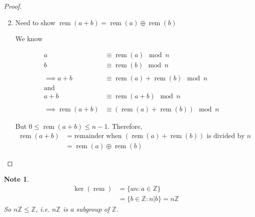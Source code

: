 \documentclass[11pt, oneside]{book}
\theoremstyle{break}
\newtheorem*{proof}{Proof}
\newtheorem*{note}{Note}
\newcommand{\bb}[1]{\mathbb{#1}}			%
\DeclareMathOperator{\rem}{rem}
\begin{document}
\begin{proof}
    \begin{enumerate}
        \setcounter{enumi}{1}
        \item Need to show $\rem(a + b) = \rem(a) \oplus \rem(b)$

            We know

            \begin{align*}
                a &\equiv \rem(a) \mod n \\
                b &\equiv \rem(b) \mod n \\
                    \\
                \implies a + b &\equiv \rem(a) + \rem(b) \mod n \\
                \text{and} \\
                a + b &\equiv \rem(a + b) \mod n \\
                    \\
                \implies \rem(a + b) &\equiv (\rem(a) + \rem(b)) \mod n
            \end{align*}

            But $0 \leq \rem(a + b) \leq n - 1$. Therefore,
            \begin{align*}
                \rem(a + b) &= \text{remainder when } (\rem(a) + \rem(b)) \text{ is divided by } n \\
                    &= \rem(a) \oplus \rem(b)
            \end{align*}
            
    \end{enumerate}
\end{proof}

\begin{note} \begin{align*}
        \ker(\rem) &= \{an : a \in \bb{Z}\} \\
            &= \{ b \in \bb{Z} : n | b \} = n \bb{Z}    
    \end{align*}
    So $n \bb{Z} \leq \bb{Z}$, i.e. $n \bb{Z}$ is a subgroup of $\bb{Z}$.
\end{note}
\end{document}
